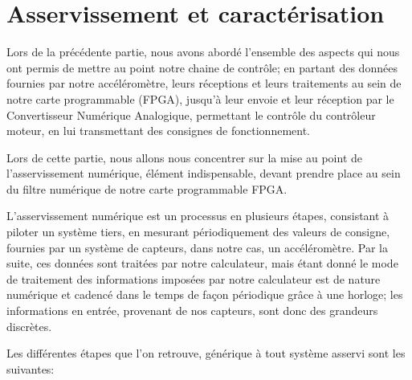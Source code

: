 \documentclass[french,a4paper,12pt]{report}
\begin{document}
	\part{Asservissement et caractérisation}
	
	Lors de la précédente partie, nous avons abordé l'ensemble des aspects qui nous ont permis de mettre au point notre chaine de contrôle; en partant des données fournies par notre accéléromètre, leurs réceptions et leurs traitements au sein de notre carte programmable (FPGA), jusqu'à leur envoie et leur réception par le Convertisseur Numérique Analogique, permettant le contrôle du contrôleur moteur, en lui transmettant des consignes de fonctionnement.
	
	Lors de cette partie, nous allons nous concentrer sur la mise au point de l'asservissement numérique, élément indispensable, devant prendre place au sein du filtre numérique de notre carte programmable FPGA.
	
	L'asservissement numérique est un processus en plusieurs étapes, consistant à piloter un système tiers, en mesurant périodiquement des valeurs de consigne, fournies par un système de capteurs, dans notre cas, un accéléromètre. 
	Par la suite, ces données sont traitées par notre calculateur, mais étant donné le mode de traitement des informations imposées par notre calculateur est de nature numérique et cadencé dans le temps de façon périodique grâce à une horloge; les informations en entrée, provenant de nos capteurs, sont donc des grandeurs discrètes.
	
	Les différentes étapes que l'on retrouve,  générique à tout système asservi sont les suivantes:
	
\end{document}
